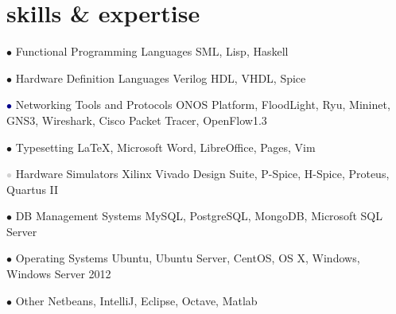 \documentclass[]{friggeri-cv} %
\begin{document}

\section{skills \& expertise}

\begin{entrylist}

	\entry
	{\textcolor{TextGreen}{$\bullet$}}
	{Functional Programming Languages}
	{}
	{SML, Lisp, Haskell}


	\entry
	{\textcolor{TextOrange}{$\bullet$}}
	{Hardware Definition Languages}
	{}
	{Verilog HDL, VHDL, Spice}


	\entry
	{\textcolor{DarkBlue}{$\bullet$}}
	{Networking Tools and Protocols}
	{}
	{ONOS Platform, FloodLight, Ryu, Mininet, GNS3, Wireshark, Cisco Packet Tracer, OpenFlow1.3}


	\entry
	{\textcolor{Ocean}{$\bullet$}}
	{Typesetting}
	{}
	{\LaTeX, Microsoft Word, LibreOffice, Pages, Vim}


	\entry
	{\textcolor{LightGray}{$\bullet$}}
	{Hardware Simulators}
	{}
	{Xilinx Vivado Design Suite, P-Spice, H-Spice, Proteus, Quartus II}


	\entry
	{\textcolor{TextYellow}{$\bullet$}}
	{DB Management Systems}
	{}
	{MySQL, PostgreSQL, MongoDB, Microsoft SQL Server}


	\entry
	{\textcolor{TextRed}{$\bullet$}}
	{Operating Systems}
	{}
	{Ubuntu, Ubuntu Server, CentOS, OS X, Windows, Windows Server 2012}


	\entry
	{\textcolor{TextPink}{$\bullet$}}
	{Other}
	{}
	{Netbeans, IntelliJ, Eclipse, Octave, Matlab}



\end{entrylist}
\end{document}
